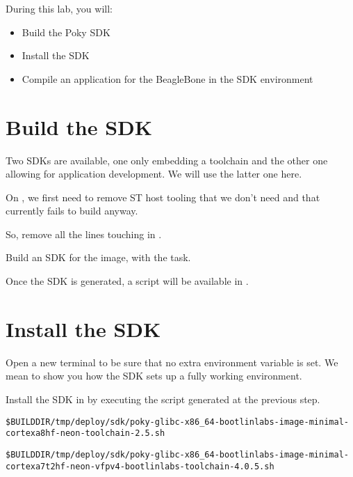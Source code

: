 
During this lab, you will:
\begin{itemize}
  \item Build the Poky SDK
  \item Install the SDK
  \item Compile an application for the BeagleBone in the SDK
    environment
\end{itemize}

\section{Build the SDK}

Two SDKs are available, one only embedding a toolchain and the
other one allowing for application development. We will use the latter one
here.

\if{}
On , we first need to remove ST host tooling that we
don't need and that currently fails to build anyway.

So, remove all the lines touching  in
.
\fi

Build an SDK for the  image, with
the  task.

Once the SDK is generated, a script will be available in
.

\section{Install the SDK}

Open a new terminal to be sure that no extra environment variable is set.
We mean to show you how the SDK sets up a fully working environment.

Install the SDK in  by executing the script
generated at the previous step.

{\footnotesize
\if{}
\begin{verbatim}
$BUILDDIR/tmp/deploy/sdk/poky-glibc-x86_64-bootlinlabs-image-minimal-cortexa8hf-neon-toolchain-2.5.sh
\end{verbatim}
\fi
\if{}
\begin{verbatim}
$BUILDDIR/tmp/deploy/sdk/poky-glibc-x86_64-bootlinlabs-image-minimal-cortexa7t2hf-neon-vfpv4-bootlinlabs-toolchain-4.0.5.sh
\end{verbatim}
\fi
}

